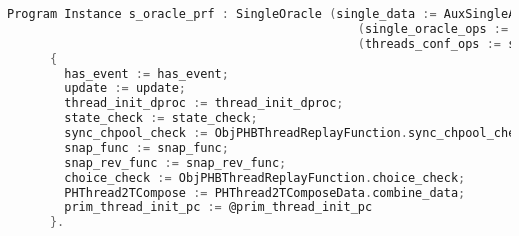 \begin{lstlisting}[language=C]
    Program Instance s_oracle_prf : SingleOracle (single_data := AuxSingleAbstractDataType.single_data) 
                                                 (single_oracle_ops := s_oracle_ops) 
                                                 (threads_conf_ops := s_threads_ops):=
      { 
        has_event := has_event;
        update := update;
        thread_init_dproc := thread_init_dproc;
        state_check := state_check;
        sync_chpool_check := ObjPHBThreadReplayFunction.sync_chpool_check;
        snap_func := snap_func;
        snap_rev_func := snap_rev_func;
        choice_check := ObjPHBThreadReplayFunction.choice_check;
        PHThread2TCompose := PHThread2TComposeData.combine_data;
        prim_thread_init_pc := @prim_thread_init_pc
      }.
\end{lstlisting}
